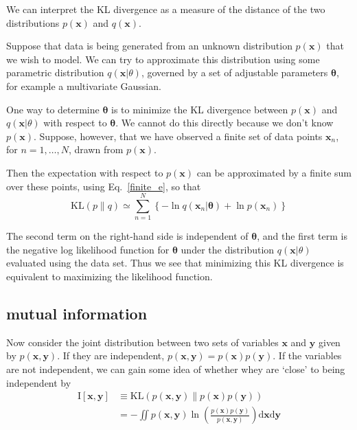 \documentclass[5p,sort&compress]{elsarticle}
\begin{document}
We can interpret the KL divergence as a measure of the distance of the two distributions $p(\mathbf{x})$ and $q(\mathbf{x})$.

Suppose that data is being generated from an unknown distribution $p(\mathbf{x})$ that we wish to model. We can try to approximate this distribution using some parametric distribution $q(\mathbf{x} | \theta)$, governed by a set of adjustable parameters $\mathbf{\theta}$, for example a multivariate Gaussian.

One way to determine $\mathbf{\theta}$ is to minimize the KL divergence between $p(\mathbf{x})$ and $q(\mathbf{x} | \theta)$ with respect to $\mathbf{\theta}$. We cannot do this directly because we don't know $p(\mathbf{x})$. Suppose, however, that we have observed a finite set of data points $\mathbf{x}_n$, for $n = 1, \dots, N$, drawn from $p(\mathbf{x})$.

Then the expectation with respect to $p(\mathbf{x})$ can be approximated by a finite sum over these points, using Eq.~\ref{finite_e}, so that
\begin{equation}
\mathrm{KL}(p \| q) \simeq \sum_{n=1}^{N}\left\{-\ln q\left(\mathbf{x}_{n} | \boldsymbol{\theta}\right)+\ln p\left(\mathbf{x}_{n}\right)\right\}
\end{equation}

The second term on the right-hand side is independent of $\mathbf{\theta}$, and the first term is the negative log likelihood function for $\mathbf{\theta}$ under the distribution $q(\mathbf{x} | \theta)$ evaluated using the data set. Thus we see that minimizing this KL divergence is equivalent to maximizing the likelihood function.


\subsection{mutual information}

Now consider the joint distribution between two sets of variables $\mathbf{x}$ and $\mathbf{y}$ given by $p(\mathbf{x}, \mathbf{y})$. If they are independent, $p(\mathbf{x}, \mathbf{y}) = p(\mathbf{x}) p(\mathbf{y})$. If the variables are not independent, we can gain some idea of whether whey are `close' to being independent by
\begin{equation}
\begin{aligned} \mathrm{I}[\mathbf{x}, \mathbf{y}] & \equiv \mathrm{KL}(p(\mathbf{x}, \mathbf{y}) \| p(\mathbf{x}) p(\mathbf{y})) \\ &=-\iint p(\mathbf{x}, \mathbf{y}) \ln \left(\frac{p(\mathbf{x}) p(\mathbf{y})}{p(\mathbf{x}, \mathbf{y})}\right) \mathrm{d} \mathbf{x} \mathrm{d} \mathbf{y} \end{aligned}
\end{equation}
\end{document}

